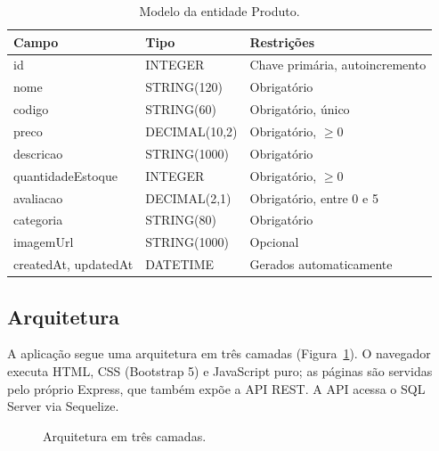 \documentclass[12pt]{article}
\begin{document}
\begin{table}[ht]
\centering
\caption{Modelo da entidade Produto.}\label{tab:modelo}
\small
\begin{tabular}{llp{5.2cm}}
\toprule
\textbf{Campo} & \textbf{Tipo} & \textbf{Restrições}\\
\midrule
id & INTEGER & Chave primária, autoincremento\\
nome & STRING(120) & Obrigatório\\
codigo & STRING(60) & Obrigatório, único\\
preco & DECIMAL(10,2) & Obrigatório, $\geq 0$\\
descricao & STRING(1000) & Obrigatório\\
quantidadeEstoque & INTEGER & Obrigatório, $\geq 0$\\
avaliacao & DECIMAL(2,1) & Obrigatório, entre 0 e 5\\
categoria & STRING(80) & Obrigatório\\
imagemUrl & STRING(1000) & Opcional\\
createdAt, updatedAt & DATETIME & Gerados automaticamente\\
\bottomrule
\end{tabular}
\end{table}

\subsection{Arquitetura}

A aplicação segue uma arquitetura em três camadas (Figura~\ref{fig:arq}). O navegador executa HTML, CSS (Bootstrap 5) e JavaScript puro; as páginas são servidas pelo próprio Express, que também expõe a API REST. A API acessa o SQL Server via Sequelize.

\begin{figure}[ht]
\centering
{}
\caption{Arquitetura em três camadas.}\label{fig:arq}
\end{figure}
\end{document}
